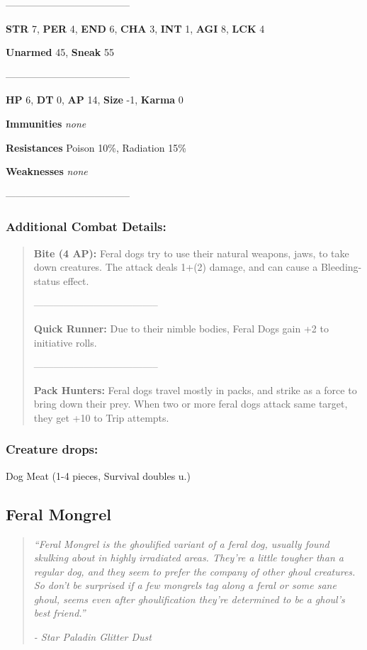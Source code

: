 \documentclass[11pt,a4paper,twocolumn]{book}
\begin{document}
	--------------------------------------
	
	\noindent
	\textbf{STR} 7, \textbf{PER} 4, \textbf{END} 6, \textbf{CHA} 3, \textbf{INT} 1, \textbf{AGI} 8, \textbf{LCK} 4
	
	\noindent
	\textbf{Unarmed} 45, \textbf{Sneak} 55
	
	--------------------------------------
	
	\noindent
	\textbf{HP} 6, \textbf{DT} 0, \textbf{AP} 14, \textbf{Size} -1, \textbf{Karma} 0
	
	
	\noindent
	\textbf{Immunities} \emph{none}
	
	\noindent
	\textbf{Resistances} Poison 10\%, Radiation 15\%
	
	\noindent
	\textbf{Weaknesses} \emph{none} %
	
	--------------------------------------
	
	\subsubsection*{Additional Combat Details:}
	\begin{verse}
		\textbf{Bite (4 AP):} Feral dogs try to use their natural weapons, jaws, to take down creatures. The attack deals 1+(2) damage, and can cause a Bleeding-status effect.
		
		--------------------------------------
		
		\textbf{Quick Runner:} Due to their nimble bodies, Feral Dogs gain +2 to initiative rolls.
		
		--------------------------------------
		
		\textbf{Pack Hunters:} Feral dogs travel mostly in packs, and strike as a force to bring down their prey. When two or more feral dogs attack same target, they get +10 to Trip attempts.

	\end{verse}
	
	\subsubsection*{Creature drops:}
	Dog Meat (1-4 pieces, Survival doubles u.)
	
	\vfill
	\subsection*{Feral Mongrel}
	\begin{quote}
		\emph{``Feral Mongrel is the ghoulified variant of a feral dog, usually found skulking about in highly irradiated areas. They're a little tougher than a regular dog, and they seem to prefer the company of other ghoul creatures. So don't be surprised if a few mongrels tag along a feral or some sane ghoul, seems even after ghoulification they're determined to be a ghoul's best friend.''}
		
		\emph{-	Star Paladin Glitter Dust}
	\end{quote}
	
\end{document}
